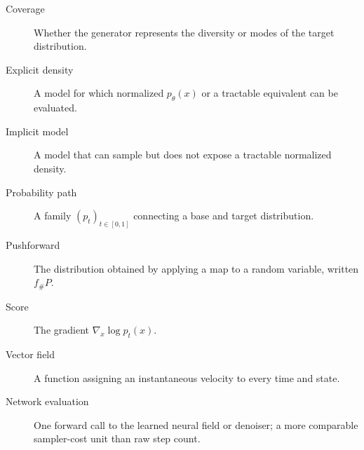 \documentclass[11pt]{article}
\begin{document}
\begin{description}
\item[Coverage] Whether the generator represents the diversity or modes of the
target distribution.
\item[Explicit density] A model for which normalized $p_\theta(x)$ or a tractable
equivalent can be evaluated.
\item[Implicit model] A model that can sample but does not expose a tractable
normalized density.
\item[Probability path] A family $(p_t)_{t\in[0,1]}$ connecting a base and target
distribution.
\item[Pushforward] The distribution obtained by applying a map to a random
variable, written $f_\#P$.
\item[Score] The gradient $\nabla_x\log p_t(x)$.
\item[Vector field] A function assigning an instantaneous velocity to every time
and state.
\item[Network evaluation] One forward call to the learned neural field or
denoiser; a more comparable sampler-cost unit than raw step count.
\end{description}
\end{document}
